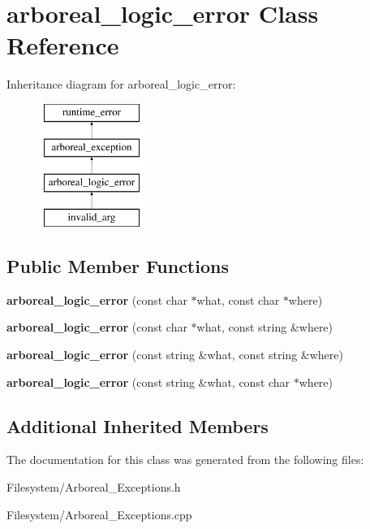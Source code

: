\hypertarget{classarboreal__logic__error}{}\section{arboreal\+\_\+logic\+\_\+error Class Reference}
\label{classarboreal__logic__error}
Inheritance diagram for arboreal\+\_\+logic\+\_\+error\+:\begin{figure}[H]
\begin{center}
\leavevmode
\includegraphics[height=4.000000cm]{classarboreal__logic__error}
\end{center}
\end{figure}
\subsection*{Public Member Functions}
\begin{DoxyCompactItemize}
\item 
\mbox{\label{classarboreal__logic__error_a47d03ca013f1bc3aaa28742fbecfa2f5}} 
{\bfseries arboreal\+\_\+logic\+\_\+error} (const char $\ast$what, const char $\ast$where)
\item 
\mbox{\label{classarboreal__logic__error_aedf21d3b0681a88498a4f3228a432d28}} 
{\bfseries arboreal\+\_\+logic\+\_\+error} (const char $\ast$what, const string \&where)
\item 
\mbox{\label{classarboreal__logic__error_a4568e1449ea4de577509ccf0df3a8632}} 
{\bfseries arboreal\+\_\+logic\+\_\+error} (const string \&what, const string \&where)
\item 
\mbox{\label{classarboreal__logic__error_a7096d545fbc92feae25553602ef4fc6a}} 
{\bfseries arboreal\+\_\+logic\+\_\+error} (const string \&what, const char $\ast$where)
\end{DoxyCompactItemize}
\subsection*{Additional Inherited Members}


The documentation for this class was generated from the following files\+:\begin{DoxyCompactItemize}
\item 
Filesystem/Arboreal\+\_\+\+Exceptions.\+h\item 
Filesystem/Arboreal\+\_\+\+Exceptions.\+cpp\end{DoxyCompactItemize}
